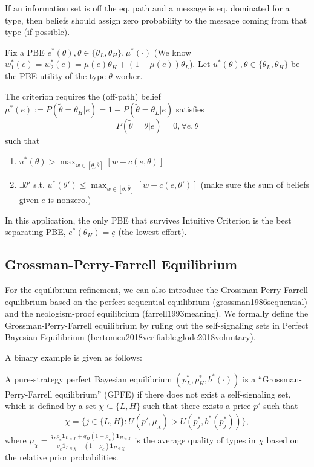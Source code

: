 \documentclass[11pt]{elegantbook_2}
\begin{document}
\begin{definition}
    If an information set is off the eq. path and a message is eq. dominated for a type, then beliefs should assign zero probability to the message coming from that type (if possible).
\end{definition}

Fix a PBE $e^*(\theta), \theta\in\{\theta_L,\theta_H\}, \mu^*(\cdot)$ (We know $w_1^*(e)=w_2^*(e)=\mu(e)\theta_H+(1-\mu(e))\theta_L$). Let $u^*(\theta),\theta\in\{\theta_L,\theta_H\}$ be the PBE utility of the type $\theta$ worker.

The criterion requires the (off-path) belief $\mu^*(e):=P(\tilde{\theta}=\theta_H|e)=1-P(\tilde{\theta}=\theta_L|e)$ satisfies $$P(\tilde{\theta}=\theta|e)=0,\forall e,\theta$$ such that
\begin{enumerate}
    \item $u^*(\theta)>\max_{w\in[\underline{\theta},\overline{\theta}]}[w-c(e,\theta)]$
    \item $\exists \theta'$ s.t. $u^*(\theta')\leq \max_{w\in[\underline{\theta},\overline{\theta}]}[w-c(e,\theta')]$ (make sure the sum of beliefs given $e$ is nonzero.)
\end{enumerate}
In this application, the only PBE that survives Intuitive Criterion is the best separating PBE, $e^*(\theta_H)=\underline{e}$ (the lowest effort).



\subsection{Grossman-Perry-Farrell Equilibrium}
For the equilibrium refinement, we can also introduce the Grossman-Perry-Farrell equilibrium based on the perfect sequential equilibrium (grossman1986sequential) and the neologism-proof equilibrium (farrell1993meaning). We formally define the Grossman-Perry-Farrell equilibrium by ruling out the self-signaling sets in Perfect Bayesian Equilibrium (bertomeu2018verifiable,glode2018voluntary).

A binary example is given as follows:
\begin{definition}
	A pure-strategy perfect Bayesian equilibrium $(p^*_L,p^*_H,b^*(\cdot))$ is a ``Grossman-Perry-Farrell equilibrium'' (GPFE) if there does not exist a self-signaling set, which is defined by a set $\chi\subseteq\{L,H\}$ such that there exists a price $p'$ such that
	\begin{equation}
		\begin{aligned}
			\chi=\{j\in\{L,H\}:U(p',\mu_\chi)>U(p_j^*,b^*(p_j^*))\},
		\end{aligned}
		\nonumber
	\end{equation}
	where $\mu_\chi=\frac{q_L\rho_e\mathbf{1}_{L\in\chi}+q_H(1-\rho_e)\mathbf{1}_{H\in\chi}}{\rho_e\mathbf{1}_{L\in\chi}+(1-\rho_e)\mathbf{1}_{H\in\chi}}$ is the average quality of types in $\chi$ based on the relative prior probabilities.
\end{definition}
\end{document}
